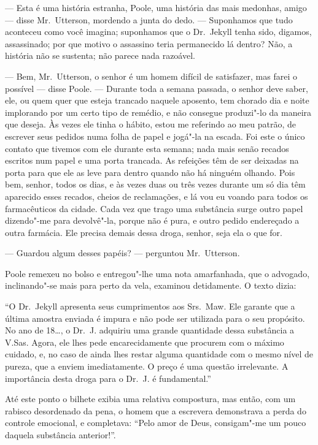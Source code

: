 --- Esta é uma história estranha, Poole, uma história das mais medonhas,
amigo --- disse Mr.~Utterson, mordendo a junta do dedo. --- Suponhamos que
tudo aconteceu como você imagina; suponhamos que o Dr.~Jekyll tenha
sido, digamos, assassinado; por que motivo o assassino teria
permanecido lá dentro? Não, a história não se sustenta; não parece nada
razoável.

--- Bem, Mr.~Utterson, o senhor é um homem difícil de satisfazer, mas
farei o possível --- disse Poole. --- Durante toda a semana passada, o
senhor deve saber, ele, ou quem quer que esteja trancado naquele
aposento, tem chorado dia e noite implorando por um certo tipo de
remédio, e não consegue produzi"-lo da maneira que deseja. Às vezes ele
tinha o hábito, estou me referindo ao meu patrão, de escrever seus
pedidos numa folha de papel e jogá"-la na escada. Foi este o único
contato que tivemos com ele durante esta semana; nada mais senão
recados escritos num papel e uma porta trancada.  As refeições têm de
ser deixadas na porta para que ele as leve para dentro quando não há
ninguém olhando.  Pois bem, senhor, todos os dias, e às vezes duas ou
três vezes durante um só dia têm aparecido esses recados, cheios de
reclamações, e lá vou eu voando para todos os farmacêuticos da cidade. 
Cada vez que trago uma substância surge outro papel dizendo"-me para
devolvê"-la, porque não é pura, e outro pedido endereçado a outra
farmácia.  Ele precisa demais dessa droga, senhor, seja ela o que for.

--- Guardou algum desses papéis? --- perguntou Mr.~Utterson.

Poole remexeu no bolso e entregou"-lhe uma nota amarfanhada, que o
advogado, inclinando"-se mais para perto da vela, examinou detidamente. 
O texto dizia:

“O Dr.~Jekyll apresenta seus cumprimentos aos Srs.~Maw.  Ele garante que
a última amostra enviada é impura e não pode ser utilizada para o seu
propósito.  No ano de 18\ldots{}, o Dr.~J. adquiriu uma grande quantidade
dessa substância a V.Sas.  Agora, ele lhes pede encarecidamente que
procurem com o máximo cuidado, e, no caso de ainda lhes restar alguma
quantidade com o mesmo nível de pureza, que a enviem imediatamente.  O
preço é uma questão irrelevante.  A importância desta droga para o Dr.~J. é fundamental.”

Até este ponto o bilhete exibia uma relativa compostura, mas então, com
um rabisco desordenado da pena, o homem que a escrevera demonstrava a
perda do controle emocional, e completava: “Pelo amor de Deus,
consigam"-me um pouco daquela substância anterior!”.

